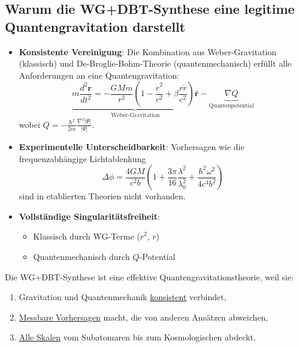 \subsection*{Warum die WG+DBT-Synthese eine legitime Quantengravitation darstellt}
\begin{itemize}
    \item \textbf{Konsistente Vereinigung}: Die Kombination aus Weber-Gravitation (klassisch) und De-Broglie-Bohm-Theorie (quantenmechanisch) erfüllt alle Anforderungen an eine Quantengravitation:
    \begin{equation}
        \underbrace{m\frac{d^2\mathbf{r}}{dt^2} = -\frac{GMm}{r^2}\left(1-\frac{\dot{r}^2}{c^2}+\beta\frac{r\ddot{r}}{c^2}\right)\hat{\mathbf{r}}}_{\text{Weber-Gravitation}} - \underbrace{\nabla Q}_{\text{Quantenpotential}}
    \end{equation}
    wobei $Q = -\frac{\hbar^2}{2m}\frac{\nabla^2|\Psi|}{|\Psi|}$.
    
    \item \textbf{Experimentelle Unterscheidbarkeit}: Vorhersagen wie die frequenzabhängige Lichtablenkung
    \begin{equation}
        \Delta\phi = \frac{4GM}{c^2b}\left(1 + \frac{3\pi}{16}\frac{\lambda^2}{\lambda_0^2} + \frac{\hbar^2\omega^2}{4c^4b^2}\right)
    \end{equation}
    sind in etablierten Theorien nicht vorhanden.
    
    \item \textbf{Vollständige Singularitätsfreiheit}: 
    \begin{itemize}
        \item Klassisch durch WG-Terme ($\dot{r}^2$, $\ddot{r}$)
        \item Quantenmechanisch durch $Q$-Potential
    \end{itemize}
\end{itemize}

\begin{tcolorbox}[
    width=\textwidth,
    colback=white,
    colframe=black,
    sharp corners,
    boxrule=0.5pt,
    left=3pt,right=3pt, %
    title=Kernaussage,
    fonttitle=\bfseries
]
Die WG+DBT-Synthese ist eine effektive Quantengravitationstheorie, weil sie:
\begin{enumerate}
    \item Gravitation und Quantenmechanik \underline{konsistent} verbindet,
    \item \underline{Messbare Vorhersagen} macht, die von anderen Ansätzen abweichen,
    \item \underline{Alle Skalen} vom Subatomaren bis zum Kosmologischen abdeckt.
\end{enumerate}
\end{tcolorbox}

